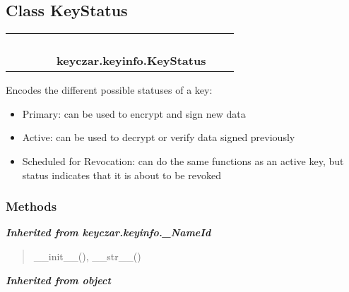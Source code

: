 \subsection{Class KeyStatus}

    \label{keyczar:keyinfo:KeyStatus}
\begin{tabular}{cccccccc}
\multicolumn{2}{r}{\settowidth{\BCL}{object}\multirow{2}{\BCL}{object}}
&&
&&
  \\\cline{3-3}
  &&\multicolumn{1}{c|}{}
&&
&&
  \\
\multicolumn{4}{r}{\settowidth{\BCL}{keyczar.keyinfo.\_NameId}\multirow{2}{\BCL}{keyczar.keyinfo.\_NameId}}
&&
  \\\cline{5-5}
  &&&&\multicolumn{1}{c|}{}
&&
  \\
&&&&\multicolumn{2}{l}{\textbf{keyczar.keyinfo.KeyStatus}}
\end{tabular}

Encodes the different possible statuses of a key:

\begin{itemize}
\setlength{\parskip}{0.6ex}
  \item Primary: can be used to encrypt and sign new data

  \item Active: can be used to decrypt or verify data signed previously

  \item Scheduled for Revocation: can do the same functions as an active key, 
    but status indicates that it is about to be revoked

\end{itemize}



  \subsubsection{Methods}


\large{\textbf{\textit{Inherited from keyczar.keyinfo.\_NameId}}}

\begin{quote}
\_\_init\_\_(), \_\_str\_\_()
\end{quote}

\large{\textbf{\textit{Inherited from object}}}

